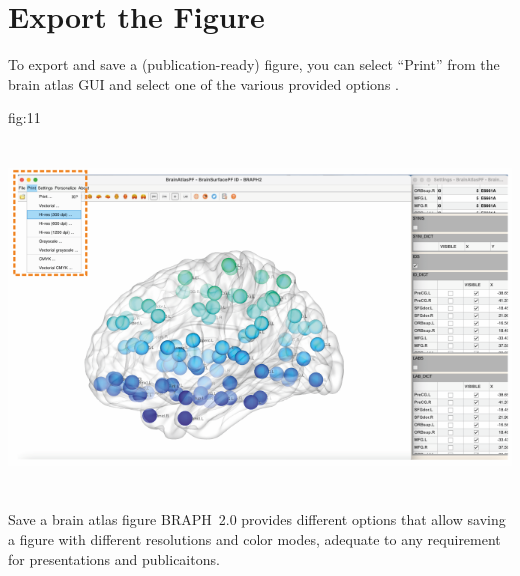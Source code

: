 \documentclass[justified]{tufte-handout}
\begin{document}
\clearpage
\section{Export the Figure}

To export and save a (publication-ready) figure, you can select ``Print'' from the brain atlas GUI and select one of the various provided options .

	{fig:11}
	{\includegraphics[height=10cm]{tut_ba/fig11.png}}
	{Save a brain atlas figure}
	{
	BRAPH~2.0 provides different options that allow saving a figure with different resolutions and color modes, adequate to any requirement for presentations and publicaitons.
	}
\end{document}
